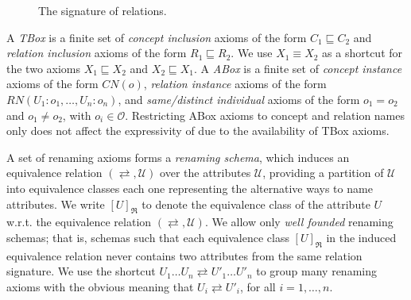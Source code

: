 \documentclass[draft]{article}
\newcommand{\Ob}{\ensuremath{\mathcal{O}}\xspace}
\begin{document}
%
\begin{figure}[t] 
	\centering
	\vspace*{-2ex}
	\caption{\label{fig:syn:tau} The signature of \DLRp relations.} 
\end{figure}
%

A \DLRp \emph{TBox} \Tmc is a finite set of \emph{concept inclusion} axioms of the form $C_1\sqsubseteq C_2$ and \emph{relation inclusion} axioms of the form $R_1\sqsubseteq R_2$. We use $X_1\equiv X_2$ as a shortcut for the two axioms $X_1\sqsubseteq X_2$ and $X_2\sqsubseteq X_1$. A \DLRp \emph{ABox} \Amc is a finite set of \emph{concept instance} axioms of the form $C\!N(o)$, \emph{relation instance} axioms of the form $R\!N(U_1\!:\!o_1,\ldots,U_n\!:\!o_n)$, and \emph{same/distinct individual} axioms of the form $o_1 = o_2$ and $o_1 \neq o_2$, with $o_i\in\Ob$. Restricting ABox axioms to concept and relation names only does not affect the expressivity of \DLRp due to the availability of TBox axioms.

A set of renaming axioms forms a \emph{renaming schema}, which induces an equivalence relation $(\rightleftarrows,\mathcal{U})$ over the attributes $\mathcal{U}$, providing a partition of $\mathcal{U}$ into equivalence classes each one representing the alternative ways to name attributes. We write $[U]_\Re$ to denote the equivalence class of the attribute $U$ w.r.t. the equivalence relation $(\rightleftarrows,\mathcal{U})$. We allow only \emph{well founded} renaming schemas; that is, schemas such that each equivalence class $[U]_\Re$ in the induced equivalence relation never contains two attributes from the same relation signature. 
%
We use the shortcut $U_1\ldots U_n\rightleftarrows U'_1\ldots U'_n$ to group many renaming axioms with the obvious meaning that $U_i\rightleftarrows U'_i$, for all $i=1,\ldots, n$.
\end{document}
